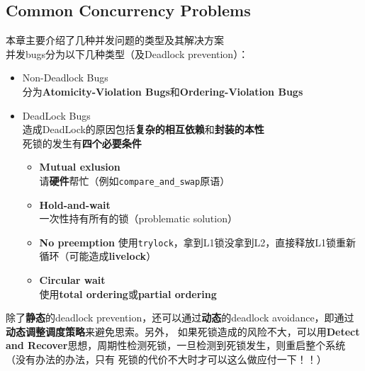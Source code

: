 \documentclass{article}
\begin{document}
\subsection{Common Concurrency Problems}
本章主要介绍了几种并发问题的类型及其解决方案 \\
并发bugs分为以下几种类型（及Deadlock prevention）： \\
\begin{itemize}
    \item Non-Deadlock Bugs \\
    分为\textbf{Atomicity-Violation Bugs}和\textbf{Ordering-Violation Bugs}
    \item DeadLock Bugs \\
    造成DeadLock的原因包括\textbf{复杂的相互依赖}和\textbf{封装的本性} \\
    死锁的发生有\textbf{四个必要条件}
    \begin{itemize}
        \item \textbf{Mutual exlusion} \\
        请\textbf{硬件}帮忙（例如\texttt{compare\_and\_swap}原语）
        \item \textbf{Hold-and-wait} \\
        一次性持有所有的锁（problematic solution）
        \item \textbf{No preemption}
        使用\texttt{trylock}，拿到L1锁没拿到L2，直接释放L1锁重新循环（可能造成\textbf{livelock}）
        \item \textbf{Circular wait} \\
        使用\textbf{total ordering}或\textbf{partial ordering}
    \end{itemize}
\end{itemize}
除了\textbf{静态}的deadlock prevention，还可以通过\textbf{动态}的deadlock avoidance，即通过\textbf{动态调整调度策略}来避免思索。另外，
如果死锁造成的风险不大，可以用\textbf{Detect and Recover}思想，周期性检测死锁，一旦检测到死锁发生，则重启整个系统（没有办法的办法，只有
死锁的代价不大时才可以这么做应付一下！！）
\end{document}
